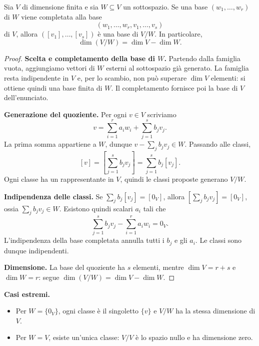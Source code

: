 \begin{teorema}
Sia $V$ di dimensione finita e sia $W\subseteq V$ un sottospazio. Se una base $(w_1,\ldots,w_r)$ di $W$ viene completata alla base
\[
  (w_1,\ldots,w_r,v_1,\ldots,v_s)
\]
di $V$, allora $([v_1],\ldots,[v_s])$ è una base di $V/W$. In particolare,
\[
  \dim(V/W)=\dim V-\dim W.
\]
\end{teorema}
\begin{proof}
\textbf{Scelta e completamento della base di $W$.} Partendo dalla famiglia vuota, aggiungiamo vettori di $W$ esterni al sottospazio già generato. La famiglia resta indipendente in $V$ e, per lo scambio, non può superare $\dim V$ elementi: si ottiene quindi una base finita di $W$. Il completamento fornisce poi la base di $V$ dell'enunciato.

\textbf{Generazione del quoziente.} Per ogni $v\in V$ scriviamo
\[
  v=\sum_{i=1}^r a_iw_i+\sum_{j=1}^s b_jv_j.
\]
La prima somma appartiene a $W$, dunque $v-\sum_j b_jv_j\in W$. Passando alle classi,
\[
  [v]=\left[\sum_{j=1}^s b_jv_j\right]=\sum_{j=1}^s b_j[v_j].
\]
Ogni classe ha un rappresentante in $V$, quindi le classi proposte generano $V/W$.

\textbf{Indipendenza delle classi.} Se $\sum_j b_j[v_j]=[0_V]$, allora $[\sum_j b_jv_j]=[0_V]$, ossia $\sum_j b_jv_j\in W$. Esistono quindi scalari $a_i$ tali che
\[
  \sum_{j=1}^s b_jv_j-\sum_{i=1}^r a_iw_i=0_V.
\]
L'indipendenza della base completata annulla tutti i $b_j$ e gli $a_i$. Le classi sono dunque indipendenti.

\textbf{Dimensione.} La base del quoziente ha $s$ elementi, mentre $\dim V=r+s$ e $\dim W=r$: segue $\dim(V/W)=\dim V-\dim W$.
\end{proof}

\textbf{Casi estremi.}
\begin{itemize}
  \item Per $W=\{0_V\}$, ogni classe è il singoletto $\{v\}$ e $V/W$ ha la stessa dimensione di $V$.
  \item Per $W=V$, esiste un'unica classe: $V/V$ è lo spazio nullo e ha dimensione zero.
\end{itemize}
